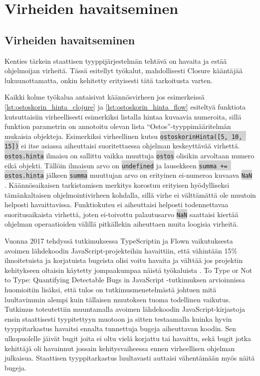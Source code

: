 \chapter{Virheiden havaitseminen}

\section{Virheiden havaitseminen}

Kenties tärkein staattisen tyyppijärjestelmän tehtävä on havaita ja estää
ohjelmoijan virheitä. Tässä esitellyt työkalut, mahdollisesti Closure
kääntäjää lukuunottamatta, onkin kehitetty erityisesti tätä tarkoitusta
varten.

Kaikki kolme työkalua antaisivat käännösvirheen jos esimerkeissä
\ref{lst:ostoskorin_hinta_clojure} ja \ref{lst:ostoskorin_hinta_flow}
esiteltyä funktiota kutsuttaisiin virheellisesti esimerkiksi listalla
hintaa kuvaavia numeroita, sillä funktion parametrin on annotoitu olevan
lista ``Ostos''-tyyppimääritelmän mukaisia objekteja. Esimerkiksi
virheellinen kutsu
\colorbox{lightgray}{\lstinline|ostoskorinHinta([5, 10, 15])|} ei itse
asiassa aiheuttaisi suoritettaessa ohjelman keskeyttävää virhettä.
\colorbox{lightgray}{\lstinline|ostos.hinta|} ilmaisu on sallittu vaikka
muuttuja \colorbox{lightgray}{\lstinline|ostos|} olisikin arvoltaan numero
eikä objekti. Tällöin ilmaisun arvo on \colorbox{lightgray}{\lstinline|undefined|}
ja lausekkeen \colorbox{lightgray}{\lstinline|summa += ostos.hinta|} jälkeen
\colorbox{lightgray}{\lstinline|summa|} muuttujan arvo on erityinen
ei-numeroa kuvaava \colorbox{lightgray}{\lstinline|NaN|} \cite{Ecma262NaN}.
Käännösaikaisen tarkistamisen merkitys korostuu erityisen hyödylliseksi
tämänkaltaisen ohjelmointivirheen kohdalla, sillä virhe ei välttämättä ole
muutoin helposti havaittavissa. Funktiokutsu ei aiheuttaisi helposti
todennettavaa suoritusaikaista virhettä, joten ei-toivottu palautusarvo
\colorbox{lightgray}{\lstinline|NaN|} saattaisi kiertää ohjelman
operaatioiden välillä pitkällekin aiheuttaen muita loogisia virheitä.

Vuonna 2017 tehdyssä tutkimuksessa TypeScriptin ja Flown vaikutuksesta avoimen
lähdekoodin JavaScript-projekteihin havaittiin, että vähintään 15\%
ilmoitetuista ja korjatuista bugeista olisi voitu havaita ja välttää jos
projektin kehitykseen oltaisin käytetty jompaakumpaa näistä työkaluista \cite{ToTypeOrNotToType}.
To Type or Not to Type: Quantifying Detectable Bugs in JavaScript -tutkimuksen
arvioinnissa huomioitiin lisäksi, että tulos on tutkimusmenetelmästä
johtuen mitä luultavimmin alempi kuin tällaisen muutoksen tuoma todellinen
vaikutus. Tutkimus toteutettiin muuntamalla avoimen lähdekoodin
JavaScript-kirjastoja ensin staattisesti tyypitettyyn muotoon ja sitten
testaamalla kuinka hyvin tyyppitarkastus havaitsi ennalta tunnettuja bugeja
aiheuttavan koodin. Sen ulkopuolelle jäivät bugit joita ei oltu vielä
korjattu tai havaittu, sekä bugit jotka kehittäjä oli havainnut jossain
kehitysvaiheessa ennen virheellisen ohjelman julkaisua. Staattisen
tyyppitarkastus luultavasti auttaisi vähentämään myös näitä bugeja.

